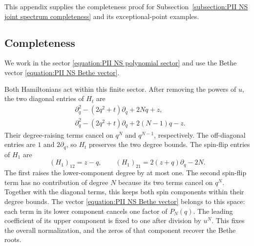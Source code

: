 \documentclass[a4paper,11pt]{article}
\numberwithin{equation}{section}
\begin{document}
This appendix supplies the completeness proof for
Subsection~\ref{subsection:PII NS joint spectrum completeness}
and its exceptional-point examples.

\subsection{Completeness}
\label{appendix:PII Bethe completeness proof}

We work in the sector
\eqref{equation:PII NS polynomial sector} and use the Bethe vector
\eqref{equation:PII NS Bethe vector}.

Both Hamiltonians act within this finite sector.  After removing
the powers of $u$, the two diagonal entries of $H_{t}$ are
\begin{equation}
	\begin{aligned}
		&\partial_{q}^{2}-(2q^{2}+t)\partial_{q}+2Nq+z,\\
		&\partial_{q}^{2}-(2q^{2}+t)\partial_{q}+2(N-1)q-z.
	\end{aligned}
\end{equation}
Their degree-raising terms cancel on $q^{N}$ and $q^{N-1}$,
respectively.  The off-diagonal entries are $1$ and
$2\partial_{q}$, so $H_{t}$ preserves the two degree bounds.
The spin-flip entries of $H_{1}$ are
\begin{equation}
	\left(H_{1}\right)_{12}=z-q,
	\qquad
	\left(H_{1}\right)_{21}=2(z+q)\partial_{q}-2N.
\end{equation}
The first raises the lower-component degree by at most one.
The second spin-flip term has no contribution of degree $N$ because
its two terms cancel on $q^{N}$.  Together with the diagonal terms,
this keeps both spin components within their degree bounds.
The vector \eqref{equation:PII NS Bethe vector} belongs to this space:
each term in its lower component cancels one factor of $P_{N}(q)$.
The leading coefficient of its upper component is fixed to one
after division by $u^{N}$.  This fixes the overall normalization,
and the zeros of that component recover the Bethe roots.
\end{document}
